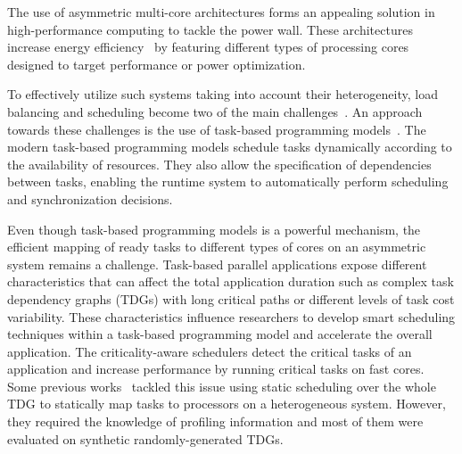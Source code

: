 The use of asymmetric multi-core architectures forms an appealing solution in high-performance computing to tackle the power wall.
These architectures increase energy efficiency~\cite{Fedorova2009,Greenhalgh2011,Casas2015} by featuring different types of processing cores designed to target performance or power optimization.

To effectively utilize such systems taking into account their heterogeneity, load balancing and scheduling become two of the main challenges~\cite{Li4}.
An approach towards these challenges is the use of task-based programming models~\cite{OmpSs_PPL11,OpenMP,StarSs,starpu}.
The modern task-based programming models schedule tasks dynamically according to the availability of resources. They also allow the specification of dependencies between tasks, enabling the runtime system to automatically perform scheduling and synchronization decisions.

Even though task-based programming models is a powerful mechanism, the efficient mapping of ready tasks to different types of cores on an asymmetric system remains a challenge.
Task-based parallel applications expose different characteristics that can affect the total application duration such as complex task dependency graphs (TDGs) with long critical paths or different levels of task cost variability.
These characteristics influence researchers to develop smart scheduling techniques within a task-based programming model and accelerate the overall application.
The criticality-aware schedulers detect the critical tasks of an application and increase performance by running critical tasks on fast cores. Some previous works~\cite{DCPS, LDCP, HEFT, CrPathDup} tackled this issue using static scheduling over the whole TDG to statically map tasks to processors on a heterogeneous system. However, they required the knowledge of profiling information and most of them were evaluated on synthetic randomly-generated TDGs. 



